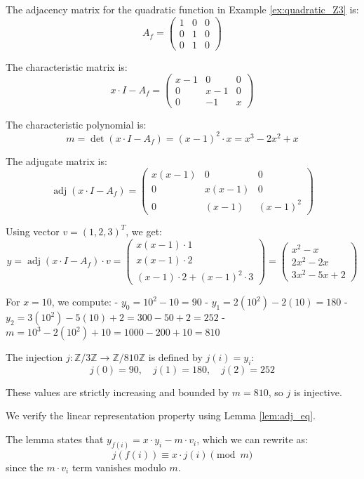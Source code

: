 \begin{remark}
The adjacency matrix for the quadratic function in Example \ref{ex:quadratic_Z3} is:
$$A_f = \begin{pmatrix}
1 & 0 & 0 \\
0 & 1 & 0 \\
0 & 1 & 0
\end{pmatrix}$$

The characteristic matrix is:
$$x \cdot I - A_f = \begin{pmatrix}
x-1 & 0 & 0 \\
0 & x-1 & 0 \\
0 & -1 & x
\end{pmatrix}$$

The characteristic polynomial is:
$$m = \det(x \cdot I - A_f) = (x-1)^2 \cdot x = x^3 - 2x^2 + x$$

The adjugate matrix is:
$$\operatorname{adj}(x \cdot I - A_f) = \begin{pmatrix}
x(x-1) & 0 & 0 \\
0 & x(x-1) & 0 \\
0 & (x-1) & (x-1)^2
\end{pmatrix}$$

Using vector $v = (1, 2, 3)^T$, we get:
$$y = \operatorname{adj}(x \cdot I - A_f) \cdot v = \begin{pmatrix}
x(x-1) \cdot 1 \\
x(x-1) \cdot 2 \\
(x-1) \cdot 2 + (x-1)^2 \cdot 3
\end{pmatrix} = \begin{pmatrix}
x^2 - x \\
2x^2 - 2x \\
3x^2 - 5x + 2
\end{pmatrix}$$

For $x = 10$, we compute:
- $y_0 = 10^2 - 10 = 90$
- $y_1 = 2(10^2) - 2(10) = 180$  
- $y_2 = 3(10^2) - 5(10) + 2 = 300 - 50 + 2 = 252$
- $m = 10^3 - 2(10^2) + 10 = 1000 - 200 + 10 = 810$

The injection $j: \mathbb{Z}/3\mathbb{Z} \to \mathbb{Z}/810\mathbb{Z}$ is defined by $j(i) = y_i$:
$$j(0) = 90, \quad j(1) = 180, \quad j(2) = 252$$

These values are strictly increasing and bounded by $m = 810$, so $j$ is injective.

We verify the linear representation property using Lemma \ref{lem:adj_eq}. 

The lemma states that $y_{f(i)} = x \cdot y_i - m \cdot v_i$, which we can rewrite as:
$$j(f(i)) \equiv x \cdot j(i) \pmod{m}$$
since the $m \cdot v_i$ term vanishes modulo $m$.


\end{remark}
